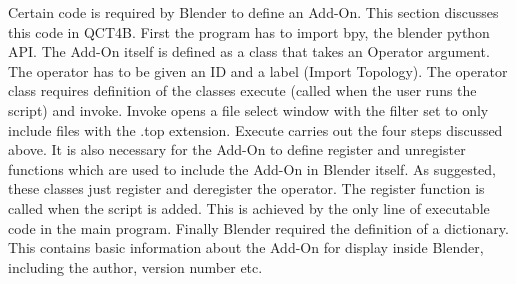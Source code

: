 \documentclass{report}
\begin{document}
Certain code is required by Blender to define an Add-On. This section discusses this code in QCT4B.
First the program has to import bpy, the blender python API.
The Add-On itself is defined as a class that takes an Operator argument.
The operator has to be given an ID 
 and a label (Import Topology).
The operator class requires definition of the classes execute (called when the user runs the script)
and invoke.
Invoke opens a file select window with the filter set to only include files with the .top extension.
Execute carries out the four steps discussed above.
It is also necessary for the Add-On to define register and unregister functions which are used to include the Add-On in Blender itself.
As suggested, these classes just register and deregister the operator. The register function is called when the script is added.
This is achieved by the only line of executable code in the main program.
Finally Blender required the definition of a dictionary. %
This contains basic information about the Add-On for display inside Blender, including the author, version number etc.
\end{document}
